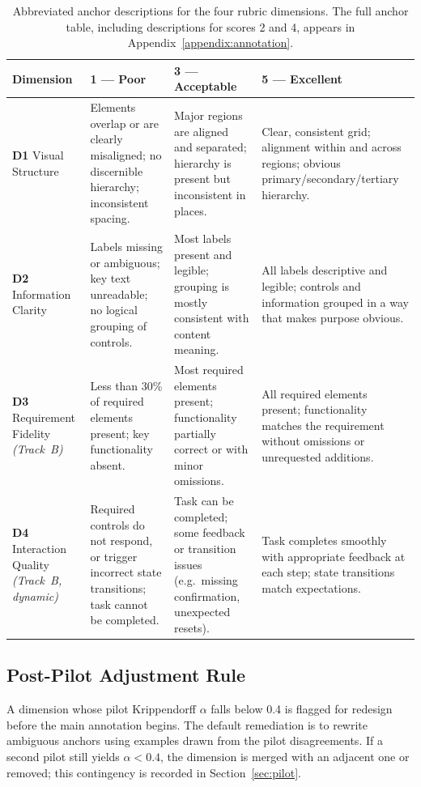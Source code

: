 \begin{table}[ht]
\centering
\small
\begin{tabular}{@{}p{2.6cm} p{3.6cm} p{3.6cm} p{3.6cm}@{}}
\toprule
\textbf{Dimension} & \textbf{1 — Poor} & \textbf{3 — Acceptable} & \textbf{5 — Excellent} \\
\midrule
\textbf{D1} Visual Structure
  & Elements overlap or are clearly mis\-aligned; no discernible
    hierarchy; inconsistent spacing.
  & Major regions are aligned and separated; hierarchy is present but
    inconsistent in places.
  & Clear, consistent grid; alignment within and across regions;
    obvious primary/secondary/tertiary hierarchy. \\[2pt]
\textbf{D2} Information Clarity
  & Labels missing or ambiguous; key text un\-readable; no logical
    grouping of controls.
  & Most labels present and legible; grouping is mostly consistent
    with content meaning.
  & All labels descriptive and legible; controls and information
    grouped in a way that makes purpose obvious. \\[2pt]
\textbf{D3} Requirement Fidelity \textit{(Track~B)}
  & Less than 30\% of required elements present; key functionality
    absent.
  & Most required elements present; functionality partially correct
    or with minor omissions.
  & All required elements present; functionality matches the
    requirement without omissions or unrequested additions. \\[2pt]
\textbf{D4} Interaction Quality \textit{(Track~B, dynamic)}
  & Required controls do not respond, or trigger incorrect state
    transitions; task cannot be completed.
  & Task can be completed; some feedback or transition issues
    (e.g.\ missing confirmation, unexpected resets).
  & Task completes smoothly with appropriate feedback at each step;
    state transitions match expectations. \\
\bottomrule
\end{tabular}
\caption{Abbreviated anchor descriptions for the four rubric
dimensions. The full anchor table, including descriptions for scores 2
and 4, appears in Appendix~\ref{appendix:annotation}.}
\label{tab:rubric-anchors}
\end{table}

\subsection{Post-Pilot Adjustment Rule}

A dimension whose pilot Krippendorff $\alpha$ falls below 0.4 is
flagged for redesign before the main annotation begins. The default
remediation is to rewrite ambiguous anchors using examples drawn from
the pilot disagreements. If a second pilot still yields $\alpha < 0.4$,
the dimension is merged with an adjacent one or removed; this
contingency is recorded in Section~\ref{sec:pilot}.

